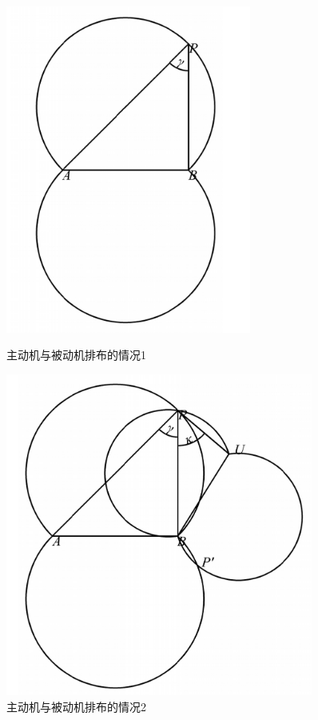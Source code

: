 \documentclass[withoutpreface,bwprint]{cumcmthesis} %
\begin{document}
\begin{figure}[H]
    \centering
    \begin{minipage}{0.49\textwidth}
        \centering
        \includegraphics[width=0.72\textwidth]{../../figure/q2_1.png} 
        \caption{主动机与被动机排布的情况1}
        \label{q2_1}
    \end{minipage}
    \begin{minipage}{0.49\textwidth}
        \centering
        \includegraphics[width=0.9\textwidth]{../../figure/q2_2.png} 
        \caption{主动机与被动机排布的情况2}
        \label{q2_2}   
    \end{minipage}
\end{figure}
\end{document}

